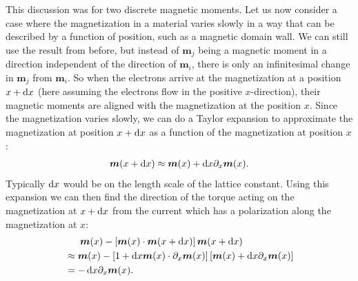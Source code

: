 This discussion was for two discrete magnetic moments. Let us now consider a case where the magnetization in a material varies slowly in a way that can be described by a function of position, such as a magnetic domain wall. We can still use the result from before, but instead of $\mathbold{m}_j$ being a magnetic moment in a direction independent of the direction of $\mathbold{m}_i$, there is only an infinitesimal change in $\mathbold{m}_j$ from $\mathbold{m}_i$. So when the electrons arrive at the magnetization at a position $x+\operatorname{d}\!{x}$ (here assuming the electrons flow in the positive $x$-direction), their magnetic moments are aligned with the magnetization at the position $x$. Since the magnetization varies slowly, we can do a Taylor expansion to approximate the magnetization at position $x+\operatorname{d}\!{x}$ as a function of the magnetization at position $x$:
\begin{align}
    \mathbold{m}(x+\d x) \approx \mathbold{m}(x) + \d x\partial_x \mathbold{m}(x).
\end{align}
Typically $\operatorname{d}\!{x}$ would be on the length scale of the lattice constant. Using this expansion we can then find the direction of the torque acting on the magnetization at $x+\operatorname{d}\!{x}$ from the current which has a polarization along the magnetization at $x$:
\begin{align}
\nonumber&\hspace{5.5mm}\mathbold{m}(x)-\left[\mathbold{m}(x)\cdot\mathbold{m}(x+\d x)\right]\mathbold{m}(x+\d x) \\
\nonumber&\approx \mathbold{m}(x)-\left[1 + \d x \mathbold{m}(x)\cdot\partial_x \mathbold{m}(x)\right]\left[\mathbold{m}(x) + \d x\partial_x \mathbold{m}(x)\right] \\
&= -\d x \partial_x \mathbold{m}(x). \label{eq:DiffSTTterm}
\end{align}
